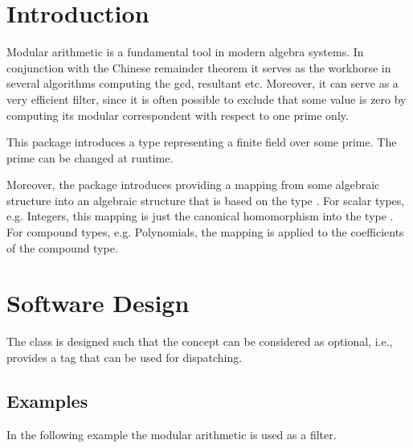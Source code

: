 \cleardoublepage
{}
\label{chap:modular_arithmetic}



\section{Introduction}

Modular arithmetic is a fundamental tool in modern algebra systems. In conjunction with the Chinese remainder theorem it serves as the workhorse in several algorithms computing the gcd, resultant etc. Moreover, it can serve as a very efficient filter, since it is often possible to exclude that some value is zero by computing its modular correspondent with respect to one prime only. 

This package introduces a type 
representing a finite field over some prime. 
The prime can be changed at runtime. 

Moreover, the package introduces  
providing a mapping from some algebraic structure  into an algebraic 
structure that is based on the type .  
For scalar types, e.g. Integers, this mapping is just the canonical homomorphism
into the type . 
For compound types, e.g. Polynomials, the mapping is applied to the 
coefficients of the compound type. 


\section{Software Design}

The class  is designed such that the concept 
 can be considered as optional, i.e., 
 provides a tag that can be used for dispatching. 

\subsection{Examples}

In the following example the modular arithmetic is used as a filter. 

